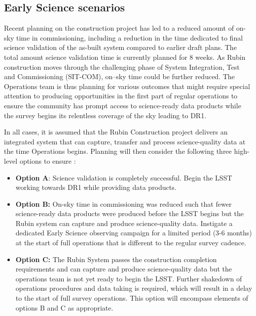 {\subsection{Early Science scenarios } \label{ssec:scenarios}


Recent planning on the construction project has led to a reduced amount of on-sky time in commissioning, including a reduction in the time dedicated to final science validation of the as-built system compared to earlier draft plans.
The total amount science validation time is currently planned for 8 weeks.
As Rubin construction moves through the challenging phase of System Integration, Test and Commissioning (SIT-COM), on--sky time could be further reduced.
The Operations team is thus planning for various outcomes that might require special attention to producing \es opportunities in the first part of regular operations to ensure the community has prompt access to science-ready data products while the survey begins its relentless coverage of the sky leading to DR1.


In all cases, it is assumed that the Rubin Construction project delivers an integrated system that can capture, transfer and process science-quality data at the time Operations begins.
Planning will then consider the following three high-level options to ensure \es:
\begin{itemize}
\item \textbf{Option A}:
Science validation is completely successful.
Begin the LSST working towards DR1 while providing \es data products.
\item \textbf{Option B:}
On-sky time in commissioning was reduced such that fewer science-ready data products were produced before the LSST begins but the Rubin system can capture and produce science-quality data.
Instigate a dedicated Early Science observing campaign for a limited period (3-6 months) at the start of full operations that is different to the regular survey cadence.
\item \textbf{Option C:}
The Rubin System  passes the construction completion requirements and can capture and produce science-quality data but the operations team is not yet ready to begin the LSST.
Further shakedown of operations procedures and data taking is required, which will result in a delay to the start of full survey operations.
This option will encompass elements of options B and C as appropriate.
\end{itemize}

}
